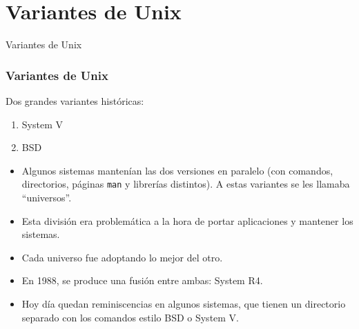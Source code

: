 \documentclass{beamer}
\begin{document}

\section{Variantes de Unix}

\begin{frame}
  \begin{center}
    \Huge{Variantes de Unix}
  \end{center}
\end{frame}



\begin{frame}
\frametitle{Variantes de Unix}

Dos grandes variantes históricas:

\begin{enumerate}
\item System V
\item BSD
\end{enumerate}

\begin{itemize}
\item Algunos sistemas mantenían las dos versiones en paralelo (con comandos, directorios, páginas \texttt{man} y librerías distintos). A estas variantes se les llamaba \alert{``universos''}.
\item Esta división era problemática a la hora de portar aplicaciones y mantener los sistemas.
\item Cada universo fue adoptando lo mejor del otro. 
\item En 1988, se produce una fusión entre ambas: \alert{System R4}. 
\item Hoy día quedan reminiscencias en algunos sistemas, que tienen un directorio separado con los comandos estilo BSD o System V.
\end{itemize}

\end{frame}

\end{document}
